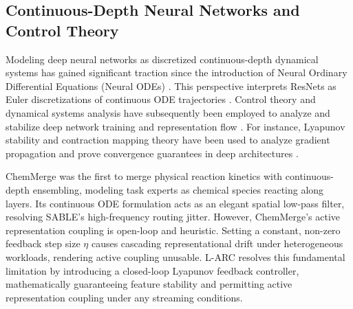 \subsection{Continuous-Depth Neural Networks and Control Theory}
Modeling deep neural networks as discretized continuous-depth dynamical systems has gained significant traction since the introduction of Neural Ordinary Differential Equations (Neural ODEs) \cite{chen2018neural}. This perspective interprets ResNets as Euler discretizations of continuous ODE trajectories \cite{he2016deep, weinan2017proposal, lu2018beyond}. 
Control theory and dynamical systems analysis have subsequently been employed to analyze and stabilize deep network training and representation flow \cite{haber2017stable, dupont2019augmented, massaroli2020differentiable}. For instance, Lyapunov stability and contraction mapping theory have been used to analyze gradient propagation and prove convergence guarantees in deep architectures \cite{banburski2019lyapunov, jentzen2020mathematical, jordan2020lyapunov}.

ChemMerge \cite{chemmerge2025} was the first to merge physical reaction kinetics with continuous-depth ensembling, modeling task experts as chemical species reacting along layers. Its continuous ODE formulation acts as an elegant spatial low-pass filter, resolving SABLE's high-frequency routing jitter. However, ChemMerge's active representation coupling is open-loop and heuristic. Setting a constant, non-zero feedback step size $\eta$ causes cascading representational drift under heterogeneous workloads, rendering active coupling unusable. L-ARC resolves this fundamental limitation by introducing a closed-loop Lyapunov feedback controller, mathematically guaranteeing feature stability and permitting active representation coupling under any streaming conditions.
